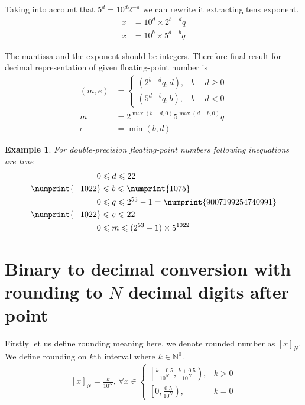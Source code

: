 \documentclass[english]{article}
\renewcommand{\leq}{\leqslant}
\renewcommand{\geq}{\geqslant}
\newtheorem{example}{Example}
\begin{document}
Taking into account that $5^d = 10^d 2^{-d}$ we can rewrite it extracting tens exponent.
\begin{align}
    x & = 10^d \times 2^{b-d} q \\
    x & = 10^b \times 5^{d-b}q
\end{align}

The mantissa and the exponent should be integers.
Therefore final result for decimal representation of given floating-point number is
\begin{align*}
    (m, e) & = \begin{cases}
        (2^{b-d} q, d), & b-d \geq 0 \\
        (5^{d-b} q, b), & b-d < 0
    \end{cases} \\
    m & = 2^{\max(b-d, 0)} 5^{\max(d-b, 0)} q \\
    e & = \min(b, d)
\end{align*}

\begin{example}
For double-precision floating-point numbers following inequations are true
    \begin{align*}
        0 & \leq d \leq 22 \\
        \numprint{-1022} & \leq b \leq \numprint{1075} \\
        0 & \leq q \leq 2^{53} - 1 = \numprint{9007199254740991} \\
        \numprint{-1022} & \leq e \leq 22 \\
        0 & \leq m \leq (2^{53} - 1) \times 5^{1022}
    \end{align*}
\end{example}

\section{Binary to decimal conversion with rounding to $N$ decimal digits after point}

Firstly let us define rounding meaning here, we denote rounded number as $\left[x \right]_{N}$.
We define rounding on $k$th interval where $k \in \mathbb{N}^0$.
\begin{align*}
    \left[x \right]_N = \frac{k}{10^N},\,
    \forall x \in \begin{cases}
        \left[\frac{k-0.5}{10^N}, \frac{k+0.5}{10^N} \right), & k>0 \\
        \left[0, \frac{0.5}{10^N} \right), & k=0
    \end{cases}
\end{align*}
\end{document}
